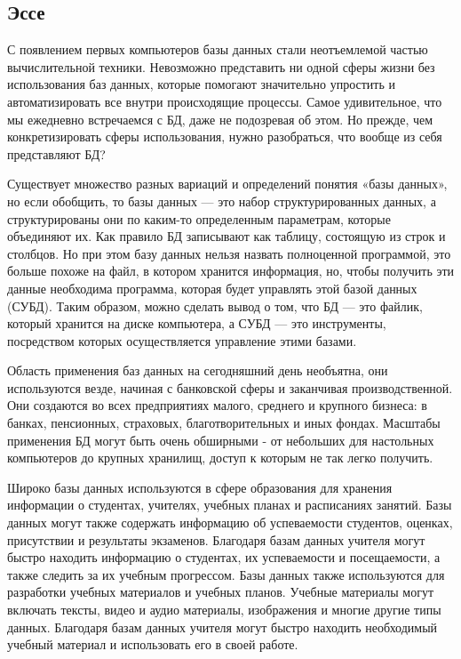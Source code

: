 \documentclass[14pt]{extreport}
\begin{document}
\subsection{Эссе}

С появлением первых компьютеров базы данных стали неотъемлемой частью вычислительной техники. Невозможно представить ни одной сферы жизни без использования баз данных, которые помогают значительно упростить и автоматизировать все внутри происходящие процессы. Самое удивительное, что мы ежедневно встречаемся с БД, даже не подозревая об этом. Но прежде, чем конкретизировать сферы использования, нужно разобраться, что вообще из себя представляют БД?

Существует множество разных вариаций и определений понятия «базы данных», но если обобщить, то базы данных — это набор структурированных данных, а структурированы они по каким-то определенным параметрам, которые объединяют их. Как правило БД записывают как таблицу, состоящую из строк и столбцов. Но при этом базу данных нельзя назвать полноценной программой, это больше похоже на файл, в котором хранится информация, но, чтобы получить эти данные необходима программа, которая будет управлять этой базой данных (СУБД). Таким образом, можно сделать вывод о том, что БД — это файлик, который хранится на диске компьютера, а СУБД — это инструменты, посредством которых осуществляется управление этими базами.

Область применения баз данных на сегодняшний день необъятна, они используются везде, начиная с банковской сферы и заканчивая производственной. Они создаются во всех предприятиях малого, среднего и крупного бизнеса: в банках, пенсионных, страховых, благотворительных и иных фондах. Масштабы применения БД могут быть очень обширными - от небольших для настольных компьютеров до крупных хранилищ, доступ к которым не так легко получить.

Широко базы данных используются в сфере образования для хранения информации о студентах, учителях, учебных планах и расписаниях занятий. Базы данных могут также содержать информацию об успеваемости студентов, оценках, присутствии и результаты экзаменов. Благодаря базам данных учителя могут быстро находить информацию о студентах, их успеваемости и посещаемости, а также следить за их учебным прогрессом. Базы данных также используются для разработки учебных материалов и учебных планов. Учебные материалы могут включать тексты, видео и аудио материалы, изображения и многие другие типы данных. Благодаря базам данных учителя могут быстро находить необходимый учебный материал и использовать его в своей работе.
\end{document}
